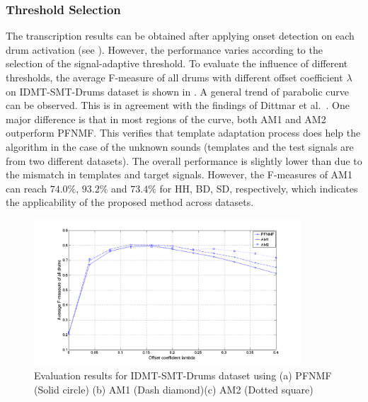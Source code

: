 \documentclass{article}
\begin{document}
\subsubsection{Threshold Selection}\label{subsec:threshold}
The transcription results can be obtained after applying onset detection on each drum activation (see ). However, the performance varies according to the selection of the signal-adaptive threshold. To evaluate the influence of different thresholds, the average F-measure of all drums with different offset coefficient $\lambda$ on IDMT-SMT-Drums dataset is shown in . A general trend of parabolic curve can be observed. This is in agreement with the findings of Dittmar et al.\ \cite{Dittmar2014}. One major difference is that in most regions of the curve, both AM1 and AM2 outperform PFNMF. This verifies that template adaptation process does help the algorithm in the case of the unknown sounds (templates and the test signals are from two different datasets). The overall performance is slightly lower than \cite{Dittmar2014} due to the mismatch in templates and target signals. However, the F-measures of AM1 can reach $74.0\%$, $93.2\%$ and $73.4\%$ for HH, BD, SD, respectively, which indicates the applicability of the proposed method across datasets. 

\begin{figure}
 \centerline{
 \includegraphics[width=10cm]{thresSelect.png}}
 \caption{Evaluation results for IDMT-SMT-Drums dataset using (a) PFNMF (Solid circle) (b) AM1 (Dash diamond)(c) AM2 (Dotted square)}%
 \label{fig:thresTest}
\end{figure}
\end{document}
